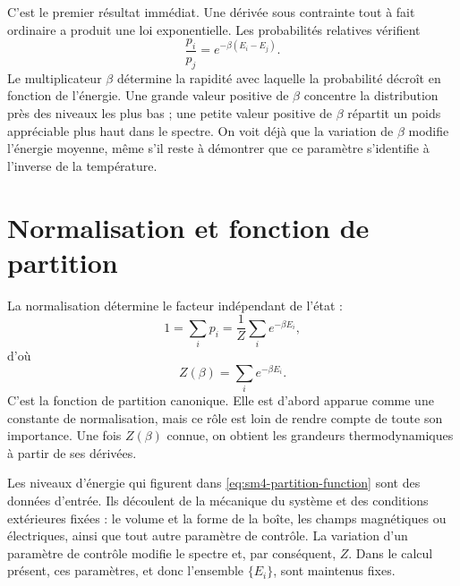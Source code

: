 C’est le premier résultat immédiat. Une dérivée sous contrainte tout à fait ordinaire a produit une loi exponentielle. Les probabilités relatives vérifient
\begin{equation}
 \frac{p_i}{p_j}=e^{-\beta(E_i-E_j)}.
 \label{eq:sm4-relative-weight}
\end{equation}
Le multiplicateur \(\beta\) détermine la rapidité avec laquelle la probabilité décroît en fonction de l’énergie. Une grande valeur positive de \(\beta\) concentre la distribution près des niveaux les plus bas ; une petite valeur positive de \(\beta\) répartit un poids appréciable plus haut dans le spectre. On voit déjà que la variation de \(\beta\) modifie l’énergie moyenne, même s’il reste à démontrer que ce paramètre s’identifie à l’inverse de la température.

\section{Normalisation et fonction de partition}

La normalisation détermine le facteur indépendant de l’état :
\begin{equation}
 1=\sum_i p_i
 =\frac{1}{Z}\sum_i e^{-\beta E_i},
\end{equation}
d’où
\begin{equation}
 Z(\beta)=\sum_i e^{-\beta E_i}.
 \label{eq:sm4-partition-function}
\end{equation}
C’est la fonction de partition canonique. Elle est d’abord apparue comme une constante de normalisation, mais ce rôle est loin de rendre compte de toute son importance. Une fois \(Z(\beta)\) connue, on obtient les grandeurs thermodynamiques à partir de ses dérivées.

Les niveaux d’énergie qui figurent dans \eqref{eq:sm4-partition-function} sont des données d’entrée. Ils découlent de la mécanique du système et des conditions extérieures fixées : le volume et la forme de la boîte, les champs magnétiques ou électriques, ainsi que tout autre paramètre de contrôle. La variation d’un paramètre de contrôle modifie le spectre et, par conséquent, \(Z\). Dans le calcul présent, ces paramètres, et donc l’ensemble \(\{E_i\}\), sont maintenus fixes.

\begin{classroomqa}
\end{classroomqa}

